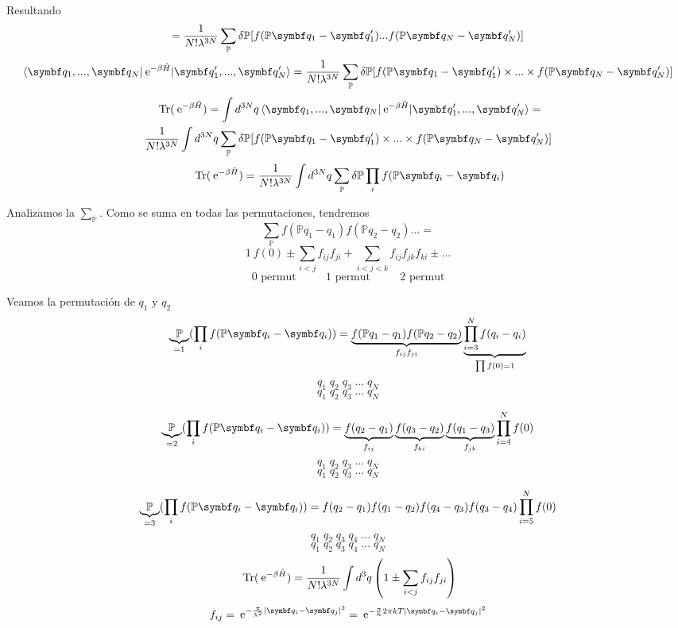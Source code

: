 \documentclass[10pt,oneside]{CBFT_book}
\begin{document}
Resultando 
\[
	= \frac{1}{N!\lambda^{3N}} \sum_{\mathbb{P}} \delta\mathbb{P} [ f( \mathbb{P}\vb{q}_1 - \vb{q}_1' ) ... 
	f( \mathbb{P}\vb{q}_N - \vb{q}_N' )]
\]
\[
	\braket{ \vb{q}_1,..., \vb{q}_N|\euler^{-\beta\hat{H}}| \vb{q}_1',..., \vb{q}_N' } = 
	\frac{1}{N!\lambda^{3N}} \sum_{\mathbb{P}} \delta\mathbb{P} [ f( \mathbb{P}\vb{q}_1 - \vb{q}_1' ) \times 
	... \times f( \mathbb{P}\vb{q}_N - \vb{q}_N' )]
\]
\begin{multline*}
	\text{ Tr} (\euler^{-\beta\hat{H}}) = \int d^{3N} q
	\braket{ \vb{q}_1,..., \vb{q}_N|\euler^{-\beta\hat{H}}| \vb{q}_1',..., \vb{q}_N' } =\\
	\frac{1}{N!\lambda^{3N}} \int d^{3N}q \sum_{\mathbb{P}} \delta\mathbb{P} [ f( \mathbb{P}\vb{q}_1 - \vb{q}_1' ) 
	\times ... \times f( \mathbb{P}\vb{q}_N - \vb{q}_N' )]
\end{multline*}
\[
	\text{ Tr} (\euler^{-\beta\hat{H}}) = \frac{1}{N!\lambda^{3N}} \int d^{3N}q \sum_{\mathbb{P}} 
	\delta\mathbb{P} \prod_i f( \mathbb{P}\vb{q}_i - \vb{q}_i )
\]

Analizamos la $\sum_{\mathbb{P}}$. Como se suma en todas las permutaciones, tendremos
\[
	\sum_{\mathbb{P}} f(\mathbb{P}{q}_1 - {q}_1) f(\mathbb{P}{q}_2 - {q}_2) ... =
\]
\[
	1 \: f(0) \pm \sum_{i<j} f_{ij} f_{ji} + \sum_{i<j<k} f_{ij} f_{jk} f_{ki} \pm ...
\]
\[
	\text{ 0 permut } \qquad \text{ 1 permut } \qquad \text{ 2 permut }
\]

Veamos la permutación de $q_1$ y $q_2$
\[
	\underbrace{\mathbb{P}}_{=1} (\prod_i f( \mathbb{P}\vb{q}_i - \vb{q}_i ) ) =
	\underbrace{f(\mathbb{P}{q}_1 - {q}_1) f(\mathbb{P}{q}_2 - {q}_2)}_{f_{ij}f_{ji}}
	\underbrace{\prod_{i=3}^N f(q_i - q_i)}_{\prod f(0)=1}
\]
\[
	q_1 \; q_2 \; q_3 \; ... \; q_N
\]
\[
	q_1 \; q_2 \; q_3 \; ... \; q_N
\]

\[
	\underbrace{\mathbb{P}}_{=2} (\prod_i f( \mathbb{P}\vb{q}_i - \vb{q}_i ) ) =
	\underbrace{f( {q}_2 - {q}_1 )}_{f_{ij}} \underbrace{f( {q}_3 - {q}_2 )}_{f_{ki}}
	\underbrace{f( {q}_1 - {q}_3 )}_{f_{jk}}
	\prod_{i=4}^N f(0)
\]
\[
	q_1 \; q_2 \; q_3 \; ... \; q_N
\]
\[
	q_1 \; q_2 \; q_3 \; ... \; q_N
\]

\[
	\underbrace{\mathbb{P}}_{=3} (\prod_i f( \mathbb{P}\vb{q}_i - \vb{q}_i ) ) =
	f( {q}_2 - {q}_1 ) f( {q}_1 - {q}_2 ) f( {q}_4 - {q}_3 ) f( {q}_3 - {q}_4 ) 
	\prod_{i=5}^N f(0)
\]
\[
	q_1 \; q_2 \; q_3 \; q_4 \; ... \; q_N
\]
\[
	q_1 \; q_2 \; q_3 \; q_4 \; ... \; q_N
\]
\[
	\text{ Tr} (\:\mathrm{e}^{-\beta\hat{H}}) = \frac{1}{N!\lambda^{3N}} \int d^{3}q 
	\left( 1 \pm \sum_{i<j} f_{ij} f_{ji}  \right)
\]
\[
	f_{ij} = \euler^{ -\frac{\pi}{\lambda^2} |\vb{q}_i - \vb{q}_j|^2} =
	\euler^{ -\frac{\pi}{h} 2\pi k T |\vb{q}_i - \vb{q}_j|^2}
\]
\end{document}
